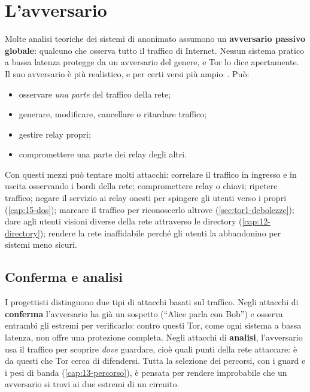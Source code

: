 \section{L'avversario}\label{sec:minaccia-avversario}

Molte analisi teoriche dei sistemi di anonimato assumono un \textbf{avversario passivo globale}: qualcuno che osserva tutto il traffico di Internet. Nessun sistema pratico a bassa latenza protegge da un avversario del genere, e Tor lo dice apertamente. Il suo avversario è più realistico, e per certi versi più ampio~\cite{dingledine2004tor}. Può:
\begin{itemize}
  \item osservare \emph{una parte} del traffico della rete;
  \item generare, modificare, cancellare o ritardare traffico;
  \item gestire relay propri;
  \item compromettere una parte dei relay degli altri.
\end{itemize}
Con questi mezzi può tentare molti attacchi: correlare il traffico in ingresso e in uscita osservando i bordi della rete; compromettere relay o chiavi; ripetere traffico; negare il servizio ai relay onesti per spingere gli utenti verso i propri (\cref{cap:15-dos}); marcare il traffico per riconoscerlo altrove (\cref{sec:tor1-debolezze}); dare agli utenti visioni diverse della rete attraverso le directory (\cref{cap:12-directory}); rendere la rete inaffidabile perché gli utenti la abbandonino per sistemi meno sicuri.

\subsection{Conferma e analisi}

I progettisti distinguono due tipi di attacchi basati sul traffico. Negli attacchi di \textbf{conferma} l'avversario ha già un sospetto (\enquote{Alice parla con Bob}) e osserva entrambi gli estremi per verificarlo: contro questi Tor, come ogni sistema a bassa latenza, non offre una protezione completa. Negli attacchi di \textbf{analisi}, l'avversario usa il traffico per scoprire \emph{dove} guardare, cioè quali punti della rete attaccare: è da questi che Tor cerca di difendersi. Tutta la selezione dei percorsi, con i guard e i pesi di banda (\cref{cap:13-percorso}), è pensata per rendere improbabile che un avversario si trovi ai due estremi di un circuito.

